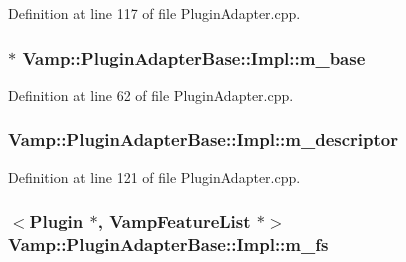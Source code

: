 Definition at line 117 of file Plugin\+Adapter.\+cpp.

\subsubsection[{\texorpdfstring{m\+\_\+base}{m_base}}]{$\ast$ Vamp\+::\+Plugin\+Adapter\+Base\+::\+Impl\+::m\+\_\+base\hspace{0.3cm}{\ttfamily [protected]}}\hypertarget{class_vamp_1_1_plugin_adapter_base_1_1_impl_ac0372df58956b4bf99a9ec070b11dea4}{}\label{class_vamp_1_1_plugin_adapter_base_1_1_impl_ac0372df58956b4bf99a9ec070b11dea4}


Definition at line 62 of file Plugin\+Adapter.\+cpp.

\subsubsection[{\texorpdfstring{m\+\_\+descriptor}{m_descriptor}}]{ Vamp\+::\+Plugin\+Adapter\+Base\+::\+Impl\+::m\+\_\+descriptor\hspace{0.3cm}{\ttfamily [protected]}}\hypertarget{class_vamp_1_1_plugin_adapter_base_1_1_impl_aeeea6028dbc6b4b96f4351a5cb79abac}{}\label{class_vamp_1_1_plugin_adapter_base_1_1_impl_aeeea6028dbc6b4b96f4351a5cb79abac}


Definition at line 121 of file Plugin\+Adapter.\+cpp.

\subsubsection[{\texorpdfstring{m\+\_\+fs}{m_fs}}]{$<${\bf Plugin} $\ast$, {\bf Vamp\+Feature\+List} $\ast$$>$ Vamp\+::\+Plugin\+Adapter\+Base\+::\+Impl\+::m\+\_\+fs\hspace{0.3cm}{\ttfamily [protected]}}\hypertarget{class_vamp_1_1_plugin_adapter_base_1_1_impl_a4d3b0d23ae969d2895f13448d294455a}{}\label{class_vamp_1_1_plugin_adapter_base_1_1_impl_a4d3b0d23ae969d2895f13448d294455a}


